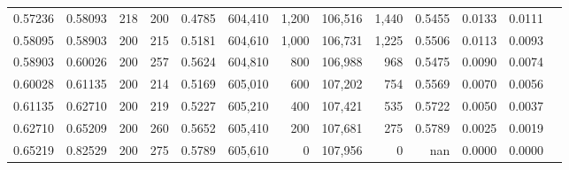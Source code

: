 \begin{tabular}{rrrrrrrrrrrrr}
0.57236 & 0.58093 &   218 & 200 &                                     0.4785 & 604,410 &   1,200 & 106,516 &   1,440 & 0.5455 & 0.0133 & 0.0111 \\
0.58095 & 0.58903 &   200 & 215 &                                     0.5181 & 604,610 &   1,000 & 106,731 &   1,225 & 0.5506 & 0.0113 & 0.0093 \\
0.58903 & 0.60026 &   200 & 257 &                                     0.5624 & 604,810 &     800 & 106,988 &     968 & 0.5475 & 0.0090 & 0.0074 \\
0.60028 & 0.61135 &   200 & 214 &                                     0.5169 & 605,010 &     600 & 107,202 &     754 & 0.5569 & 0.0070 & 0.0056 \\
0.61135 & 0.62710 &   200 & 219 &                                     0.5227 & 605,210 &     400 & 107,421 &     535 & 0.5722 & 0.0050 & 0.0037 \\
0.62710 & 0.65209 &   200 & 260 &                                     0.5652 & 605,410 &     200 & 107,681 &     275 & 0.5789 & 0.0025 & 0.0019 \\
0.65219 & 0.82529 &   200 & 275 &                                     0.5789 & 605,610 &       0 & 107,956 &       0 &    nan & 0.0000 & 0.0000 \\
\bottomrule
\end{tabular}
